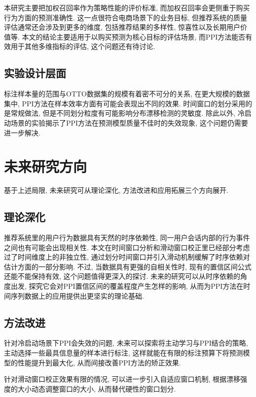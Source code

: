 \documentclass[a4paper, AutoFakeBold, UTF8]{ctexrep}
\theoremstyle{plain}
\numberwithin{equation}{chapter}
\begin{document}
本研究主要把加权召回率作为策略性能的评价标准, 而加权召回率会更侧重于购买行为方面的预测准确性. 这一点很符合电商场景下的业务目标, 但推荐系统的质量评估通常还会涉及到更多的维度, 包括推荐结果的多样性, 惊喜性以及长期用户价值等. 本文的结论主要适用于以购买预测为核心目标的评估场景, 而PPI方法能否有效用于其他多维指标的评估, 这个问题还有待讨论. 

\subsection{实验设计层面}

标注样本量的范围与OTTO数据集的规模有着密不可分的关系, 在更大规模的数据集中, PPI方法在样本效率方面有可能会表现出不同的效果. 时间窗口的划分采用的是常规做法, 但是不同划分粒度有可能影响分布漂移检测的灵敏度. 除此以外, 冷启动场景的实验揭示了PPI方法在预测模型质量不佳时的失效现象, 这个问题仍需要进一步解决. 


\section{未来研究方向}

基于上述局限, 未来研究可从理论深化, 方法改进和应用拓展三个方向展开. 

\subsection{理论深化}

推荐系统里的用户行为数据具有天然的时序依赖性, 同一用户会话内部的行为事件之间也有可能会出现相关性. 本文在时间窗口分析和滑动窗口校正里已经部分考虑过了时间维度上的非独立性, 通过划分时间窗口并引入滑动机制缓解了时序依赖对估计方面的一部分影响. 不过, 当数据具有更强的自相关性时, 现有的置信区间公式还能不能保持有效, 这个问题值得更深入的探讨. 未来的研究可以从时序依赖的角度出发, 探究它会对PPI置信区间的覆盖程度产生怎样的影响, 从而为PPI方法在时间序列数据上的应用提供出更坚实的理论基础. 

\subsection{方法改进}

针对冷启动场景下PPI会失效的问题, 未来可以探索将主动学习与PPI结合的策略, 主动选择一些最具信息量的样本进行标注, 这样就能在有限的标注预算下将预测模型的性能提升到最大化, 从而间接改善PPI方法的矫正效果. 

针对滑动窗口校正效果有限的情况, 可以进一步引入自适应窗口机制, 根据漂移强度的大小动态调整窗口的大小, 从而替代硬性的窗口划分. 
\end{document}
